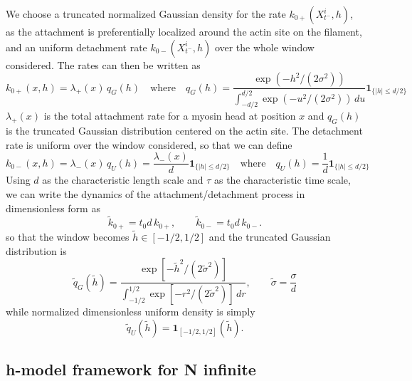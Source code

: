 \documentclass{article}
\begin{document}
We choose a truncated normalized Gaussian density for the rate $k_{0+}(X_{t^-}^i, h)$, as the attachment is preferentially localized around the actin site on the filament, and an uniform detachment rate $k_{0-}(X_{t^-}^i, h)$ over the whole window considered.  
The rates can then be written as
\begin{equation}
    k_{0+}(x, h) 
=\lambda_+(x)\,q_G(h)
\quad \text{where} \quad q_G(h)=
\frac{\exp(-h^2/(2\sigma^2))}
{\displaystyle\int_{-d/2}^{d/2}\exp(-u^2/(2\sigma^2))\,du}
\mathbf 1_{\{|h|\le d/2\}}
\end{equation}
$\lambda_+(x)$ is the total attachment rate for a myosin head at position $x$ and $q_G(h)$ is the truncated Gaussian distribution centered on the actin site. 
The detachment rate is uniform over the window considered, so that we can define 
\begin{equation}
    k_{0-}(x, h) = \lambda_-(x)\,q_U(h) = \frac{\lambda_-(x)}{d}\mathbf 1_{\{|h|\le d/2\}} \quad \text{where} \quad q_U(h) = \frac{1}{d}\mathbf 1_{\{|h|\le d/2\}}
\end{equation}
Using $d$ as the characteristic length scale and $\tau$ as the characteristic time scale, we can write the dynamics of the attachment/detachment process in dimensionless form as
\begin{equation}
\tilde k_{0+}=t_0d\,k_{0+},
\qquad
\tilde k_{0-}=t_0d\,k_{0-}.
\end{equation}
so that the window becomes $\tilde{h} \in [-1/2, 1/2]$ and the truncated Gaussian distribution is
\begin{equation}
\tilde{q}_G(\tilde{h})=
\frac{\exp[-\tilde h^2/(2\tilde\sigma^2)]}
{\displaystyle\int_{-1/2}^{1/2}
\exp[-r^2/(2\tilde\sigma^2)]\,dr},
\qquad
\tilde\sigma=\frac{\sigma}{d}
\end{equation}
while normalized dimensionless uniform density is simply
\begin{equation}
\tilde q_U(\tilde h)=\mathbf 1_{[-1/2,1/2]}(\tilde h).
\end{equation}

\subsection{h-model framework for N infinite}
\end{document}
